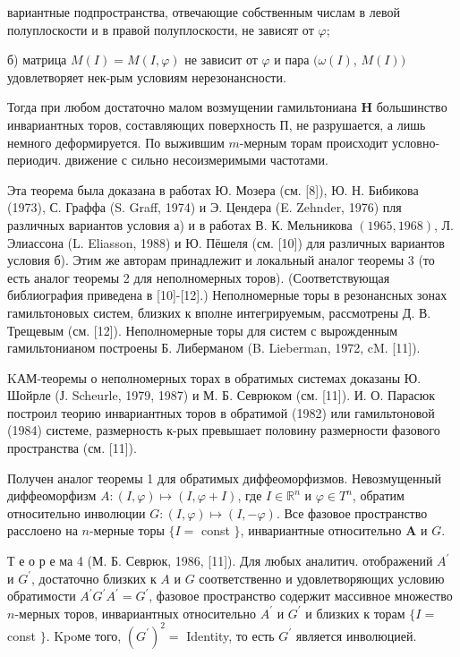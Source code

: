\documentclass[10pt]{article}
\begin{document}
вариантные подпространства, отвечающие собственным числам в левой полуплоскости и в правой полуплоскости, не зависят от $\varphi$;



б) матрица $M(I)=M(I, \varphi)$ не зависит от $\varphi$ и пара $(\omega(I)$, $M(I))$ удовлетворяет нек-рым условиям нерезонансности.



Тогда при любом достаточно малом возмущении гамильтониана $\boldsymbol{H}$ большинство инвариантных торов, составляющих поверхность П, не разрушается, а лишь немного деформируется. По выжившим $m$-мерным торам происходит условно-периодич. движение с сильно несоизмеримыми частотами.



Эта теорема была доказана в работах Ю. Мозера (см. [8]), Ю. Н. Бибикова (1973), С. Граффа (S. Graff, 1974) и Э. Цендера (E. Zehnder, 1976) пля различных вариантов условия а) и в работах В. К. Мельникова $(1965,1968)$, Л. Элиассона (L. Eliasson, 1988) и Ю. Пёшеля (см. [10]) для различных вариантов условия б). Этим же авторам принадлежит и локальный аналог теоремы 3 (то есть аналог теоремы 2 для неполномерных торов). (Соответствующая библиография приведена в [10]-[12].) Неполномерные торы в резонансных зонах гамильтоновых систем, близких к вполне интегрируемым, рассмотрены Д. В. Трещевым (см. [12]). Неполномерные торы для систем с вырожденным гамильтонианом построены Б. Либерманом (B. Lieberman, 1972, cM. [11]).



KАМ-теоремы о неполномерных торах в обратимых системах доказаны Ю. Шойрле (Ј. Scheurle, 1979, 1987) и М. Б. Севрюком (см. [11]). И. О. Парасюк построил теорию инвариантных торов в обратимой (1982) или гамильтоновой (1984) системе, размерность к-рых превышает половину размерности фазового пространства (см. [11]).



Получен аналог теоремы 1 для обратимых диффеоморфизмов. Невозмущенный диффеоморфизм $A:(I, \varphi) \mapsto(I, \varphi+I)$, где $I \in \mathbb{R}^{n}$ и $\varphi \in T^{n}$, обратим относительно инволюции $G:(I, \varphi) \mapsto(I,-\varphi)$. Все фазовое пространство расслоено на $n$-мерные торы $\{I=$ const $\}$, инвариантные относительно $\boldsymbol{A}$ и $G$.



Т е о р е ма 4 (М. Б. Севрюк, 1986, [11]). Для любых аналитич. отображений $A^{\prime}$ и $G^{\prime}$, достаточно близких к $A$ и $G$ соответственно и удовлетворяющих условию обратимости $A^{\prime} G^{\prime} A^{\prime}=G^{\prime}$, фазовое пространство содержит массивное множество $n$-мерных торов, инвариантных относительно $A^{\prime}$ и $G^{\prime}$ и близких к торам $\{I=$ const $\}$. Kpoме того, $\left(G^{\prime}\right)^{2}=$ Identity, то есть $G^{\prime}$ является инволюцией.
\end{document}
